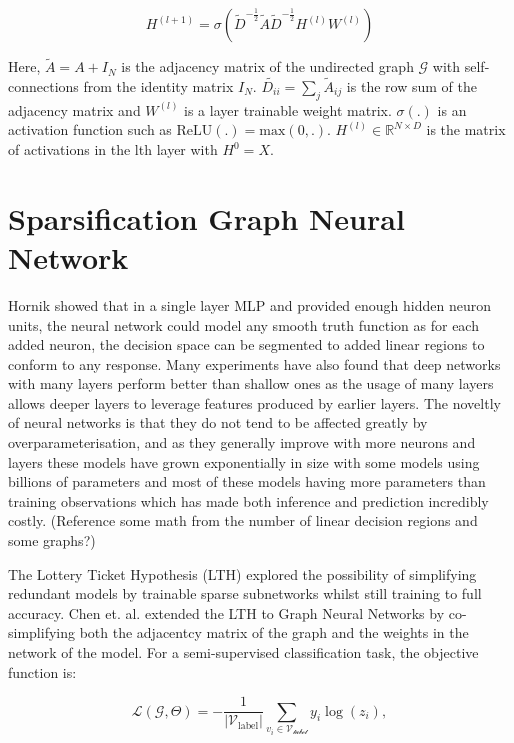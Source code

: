 \documentclass[honours,12pt]{unswthesis}
\numberwithin{equation}{section}
\begin{document}
\begin{equation}
    H^{(l+1)} = \sigma(\tilde{D}^{-\frac{1}{2}} \tilde{A} \tilde{D}^{-\frac{1}{2}} H^{(l)} W^{(l)})
\end{equation}

\noindent Here, $\tilde{A} = A + I_N$ is the adjacency matrix of the undirected graph $\mathcal{G}$ with self-connections from the identity matrix $I_N$.
$\tilde{D_{ii}} = \sum_{j} \tilde{A}_{ij} $ is the row sum of the adjacency matrix and $W^{(l)}$ is a layer trainable weight matrix. 
$\sigma(.)$ is an activation function such as $\text{ReLU}(.) = \text{max}(0, .)$. $H^{(l)} \in \mathbb{R}^{N \times D}$ is the matrix of activations
in the lth layer with $H^0 = X$. 


\section{Sparsification Graph Neural Network}\label{sparse-learning}

Hornik\cite{HORNIK1991251} showed that in a single layer MLP and provided enough hidden neuron units, the neural network could model any smooth truth function as for each added neuron, 
the decision space can be segmented to added linear regions to conform to any response. 
Many experiments have also found that deep networks with many layers perform better than shallow ones\cite{NIPS2014_109d2dd3}\cite{pmlr-v70-raghu17a}
as the usage of many layers allows deeper layers to leverage features produced by earlier layers.
The noveltly of neural networks is that they do not tend to be affected greatly by overparameterisation\cite{Cao_Gu_2020}, and as they generally improve with more neurons
and layers these models have grown exponentially in size with some models using billions of parameters and most of these models having more parameters than training observations
which has made both inference and prediction incredibly costly.  (Reference some math from the number of linear decision regions and some graphs?)
 
The Lottery Ticket Hypothesis (LTH)\cite{frankle2020linear} explored the possibility of simplifying redundant models by trainable sparse subnetworks whilst
still training to full accuracy. Chen et. al.\cite{chen2021unified} extended the LTH to Graph Neural Networks by co-simplifying both the adjacentcy matrix of the graph and the weights in 
the network of the model. For a semi-supervised classification task, the objective function is:

\begin{equation}
    \mathcal{L}(\mathcal{G}, \Theta) = -\frac{1}{|\mathcal{V}_{\text{label}}|}\sum_{v_i \in \mathcal{V_{\text{label}}}} y_i \log{(z_i)},
\end{equation}
\end{document}
